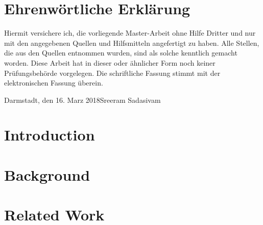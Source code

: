 \documentclass[longdoc,accentcolor=tud1b,12pt,paper=a4]{tudreport}
\title{\deedsTitle}
\subtitle{\deedsThesisType}
\newcommand{\deedsThesisType}{Master-Arbeit\xspace} %
\newcommand{\deedsName}{Sreeram Sadasivam\xspace}
\newcommand{\deedsSubmissionDate}{16. Marz 2018\xspace}%
\begin{document}
	\frenchspacing
	\raggedbottom
	\maketitle
	
	\chapter*{Ehrenw\"ortliche Erkl\"arung}
	Hiermit versichere ich, die vorliegende \deedsThesisType ohne Hilfe Dritter und nur mit den angegebenen Quellen
    und Hilfsmitteln angefertigt zu haben. Alle Stellen, die aus den Quellen entnommen wurden, sind als solche
    kenntlich gemacht worden. Diese Arbeit hat in dieser oder \"ahnlicher Form noch keiner Pr\"ufungsbeh\"orde vorgelegen.
    Die schriftliche Fassung stimmt mit der elektronischen Fassung \"uberein.
    
	
	\vspace{1.5cm}
	
	\noindent Darmstadt, den \deedsSubmissionDate\hfill \deedsName
	
	\tableofcontents
	\listoffigures
	\listoftables
	\lstlistoflistings
	\begin{abstract}
	
	\end{abstract}		
	
	
	\cleardoublepage

	
	\chapter{Introduction \label{intro}}	
			
	
	\chapter{Background \label{bkgd}}
	
	
	\chapter{Related Work \label{rel_work}}
	
	
\end{document}
